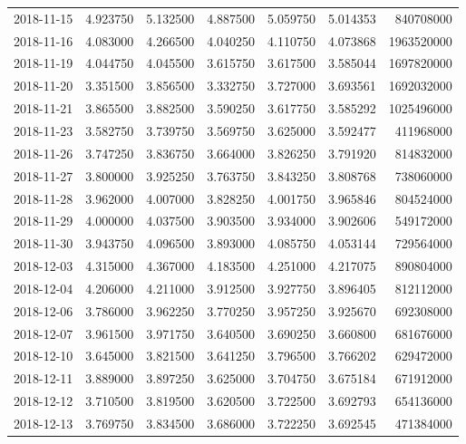 \begin{tabular}{lrrrrrr}
2018-11-15 &    4.923750 &    5.132500 &    4.887500 &    5.059750 &    5.014353 &   840708000 \\
2018-11-16 &    4.083000 &    4.266500 &    4.040250 &    4.110750 &    4.073868 &  1963520000 \\
2018-11-19 &    4.044750 &    4.045500 &    3.615750 &    3.617500 &    3.585044 &  1697820000 \\
2018-11-20 &    3.351500 &    3.856500 &    3.332750 &    3.727000 &    3.693561 &  1692032000 \\
2018-11-21 &    3.865500 &    3.882500 &    3.590250 &    3.617750 &    3.585292 &  1025496000 \\
2018-11-23 &    3.582750 &    3.739750 &    3.569750 &    3.625000 &    3.592477 &   411968000 \\
2018-11-26 &    3.747250 &    3.836750 &    3.664000 &    3.826250 &    3.791920 &   814832000 \\
2018-11-27 &    3.800000 &    3.925250 &    3.763750 &    3.843250 &    3.808768 &   738060000 \\
2018-11-28 &    3.962000 &    4.007000 &    3.828250 &    4.001750 &    3.965846 &   804524000 \\
2018-11-29 &    4.000000 &    4.037500 &    3.903500 &    3.934000 &    3.902606 &   549172000 \\
2018-11-30 &    3.943750 &    4.096500 &    3.893000 &    4.085750 &    4.053144 &   729564000 \\
2018-12-03 &    4.315000 &    4.367000 &    4.183500 &    4.251000 &    4.217075 &   890804000 \\
2018-12-04 &    4.206000 &    4.211000 &    3.912500 &    3.927750 &    3.896405 &   812112000 \\
2018-12-06 &    3.786000 &    3.962250 &    3.770250 &    3.957250 &    3.925670 &   692308000 \\
2018-12-07 &    3.961500 &    3.971750 &    3.640500 &    3.690250 &    3.660800 &   681676000 \\
2018-12-10 &    3.645000 &    3.821500 &    3.641250 &    3.796500 &    3.766202 &   629472000 \\
2018-12-11 &    3.889000 &    3.897250 &    3.625000 &    3.704750 &    3.675184 &   671912000 \\
2018-12-12 &    3.710500 &    3.819500 &    3.620500 &    3.722500 &    3.692793 &   654136000 \\
2018-12-13 &    3.769750 &    3.834500 &    3.686000 &    3.722250 &    3.692545 &   471384000 \\

\end{tabular}
